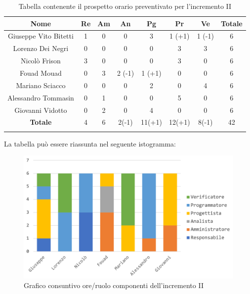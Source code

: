 			\begin{longtable}{|c|c|c|c|c|c|c|c}
				\hline
				\rowcolor{lighter-grayer}
				\textbf{Nome} & \textbf{Re} & \textbf{Am} & \textbf{An} & \textbf{Pg}  & \textbf{Pr}   & \textbf{Ve} & \textbf{Totale} \\
				\hline
				\endfirsthead
				\hline
				Giuseppe Vito Bitetti  & 1 & 0 & 0 & 3 & 1 (+1) & 1 (-1) & 6\\
				\hline
				\hline
				Lorenzo Dei Negri      & 0 & 0 & 0 & 0 & 3 & 3 & 6 \\
				\hline
				\hline
				Nicolò Frison 			  & 3 & 0 & 0 & 0 & 3 & 0 & 6 \\
				\hline
				\hline
				Fouad Mouad 			& 0 & 3 & 2 (-1) & 1 (+1) & 0 & 0 & 6 \\
				\hline
				\hline
				Mariano Sciacco			 & 0 & 0 & 0 & 2 & 0 & 4 & 6 \\
				\hline
				\hline
				Alessandro Tommasin & 0 & 1 & 0 & 0 & 5 & 0 & 6 \\
				\hline
				\hline
				Giovanni Vidotto 		& 0 & 2 & 0 & 4 & 0 & 0 & 6\\
				\hline 
				\textbf{Totale} 		   & 4 &  6 & 2(-1) & 11(+1) & 12(+1) & 8(-1) & 42\\
				\hline 
				
				\caption{Tabella contenente il prospetto orario preventivato per l'incremento II}
			\end{longtable}
			
			La tabella può essere riassunta nel seguente istogramma:
			
			\begin{figure}[H]
				\centering
				\includegraphics[width=0.8\linewidth]{images/consuntivo/ConsIncr2-1.png}
				\caption{Grafico consuntivo ore/ruolo componenti dell'incremento II}
				\label{fig:consuntivo grafico suddivione ruoli incremento II}
			\end{figure}
			\pagebreak
			
